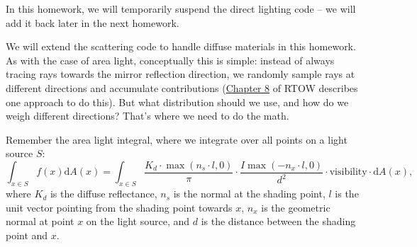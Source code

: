 In this homework, we will temporarily suspend the direct lighting code -- we will add it back later in the next homework.

We will extend the scattering code to handle diffuse materials in this homework. As with the case of area light, conceptually this is simple: instead of always tracing rays towards the mirror reflection direction, we randomly sample rays at different directions and accumulate contributions (\href{https://raytracing.github.io/books/RayTracingInOneWeekend.html#diffusematerials}{Chapter 8} of RTOW describes one approach to do this). But what distribution should we use, and how do we weigh different directions? That's where we need to do the math.

Remember the area light integral, where we integrate over all points on a light source $S$:
\begin{equation}
\int_{x \in S} f(x) \mathrm{d}A(x) = \int_{x \in S} \frac{K_d \cdot \max\left(n_s \cdot l, 0\right)}{\pi} \cdot \frac{I \max\left(-n_x \cdot l, 0\right)}{d^2} \cdot \text{visibility} \cdot \mathrm{d}A(x),
\label{eq:area_light}
\end{equation}
where $K_d$ is the diffuse reflectance, $n_s$ is the normal at the shading point, $l$ is the unit vector pointing from the shading point towards $x$, $n_x$ is the geometric normal at point $x$ on the light source, and $d$ is the distance between the shading point and $x$.


